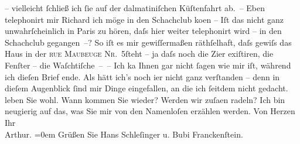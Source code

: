 \begin{ledgroupsized}[t]{13cm}
               – viel{\pb}leicht ſchließ ich ſie auf der dalmatiniſchen Küſtenfahrt ab. –\pend
           \pstart
           Eben telephonirt mir Richard ich möge in den Schachclub ko{\geminationm}en – Iſt
               das nicht ganz unwahrſcheinlich in Paris zu hören,
               daſs hier weiter telephonirt wird – in den Schachclub gegangen –? So iſt es mir gewiſſermaßen räthſelhaft, daſs gewiſs
               das Haus {\pb}in der \textsc{rue Maubeuge Nr. 5}ſteht – ja daſs noch die Zi{\geminationm}er exiſtiren, die Fenſter – die Waſchtiſche – –\pend
           \pstart
           Ich ka{\geminationn} Ihnen gar nicht ſagen wie mir iſt, während ich
               dieſen Brief ende. Als hätt ich’s noch i{\geminationm}er nicht ganz
                  verſtanden – denn in dieſem
               Augenblick ſind mir Dinge eingefallen, an die ich ſeitdem nicht gedacht.\pend
           \pstart
           {\pb}leben Sie wohl. Wann kommen Sie wieder? Werden wir
                  zuſa{\geminationm}en radeln? Ich bin neugierig auf das, was Sie
               mir von den Namenloſen erzählen werden.\pend
           \pstart
           Von Herzen{\\[\baselineskip]}Ihr{\\[\baselineskip]}\spacefill\mbox{Arthur.}\pend
           \leftskip=0em{}\pstart
           Grüßen Sie Hans Schleſinger u. Bubi Franckenſtein.\pend
           \endnumbering{}\end{ledgroupsized}  \newcommand{\dateiname}{L01024}\newcommand{\titel}{Arthur Schnitzler an Hugo von Hofmannsthal, 23. 3. 1900}\newcommand{\editorInnen}{Martin Anton Müller und Gerd-Hermann Susen}
      